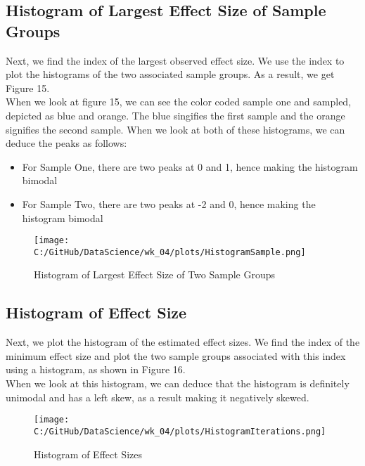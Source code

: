 \documentclass[a4paper,twocolumn]{article}
\begin{document}
\subsection{Histogram of Largest Effect Size of Sample Groups}
Next, we find the index of the largest observed effect size. We use the index to plot the histograms of the
two associated sample groups. As a result, we get Figure 15. \\

When we look at figure 15, we can see the color coded sample one and sampled, depicted as blue and orange. The blue 
singifies the first sample and the orange signifies the second sample. When we look at both of these histograms,
we can deduce the peaks as follows:
\begin{itemize}
    \item For Sample One, there are two peaks at 0 and 1, hence making the histogram bimodal
    \item For Sample Two, there are two peaks at -2 and 0, hence making the histogram bimodal
\end{itemize}

\begin{figure}[htbp] 
    \centering
    \noindent
    \texttt{[image: C:/GitHub/DataScience/wk\_04/plots/HistogramSample.png]}
    \caption{Histogram of Largest Effect Size of Two Sample Groups} 
\end{figure}

\newpage

\subsection{Histogram of Effect Size}

Next, we plot the histogram of the estimated effect sizes. We find the index of the minimum effect size and 
plot the two sample groups associated with this index using a histogram, as shown in Figure 16. \\

When we look at this histogram, we can deduce that the histogram is definitely unimodal and has a left skew,
as a result making it negatively skewed. 

\begin{figure}[htbp] 
    \centering
    \noindent
    \texttt{[image: C:/GitHub/DataScience/wk\_04/plots/HistogramIterations.png]}
    \caption{Histogram of Effect Sizes} 
\end{figure}
\end{document}
